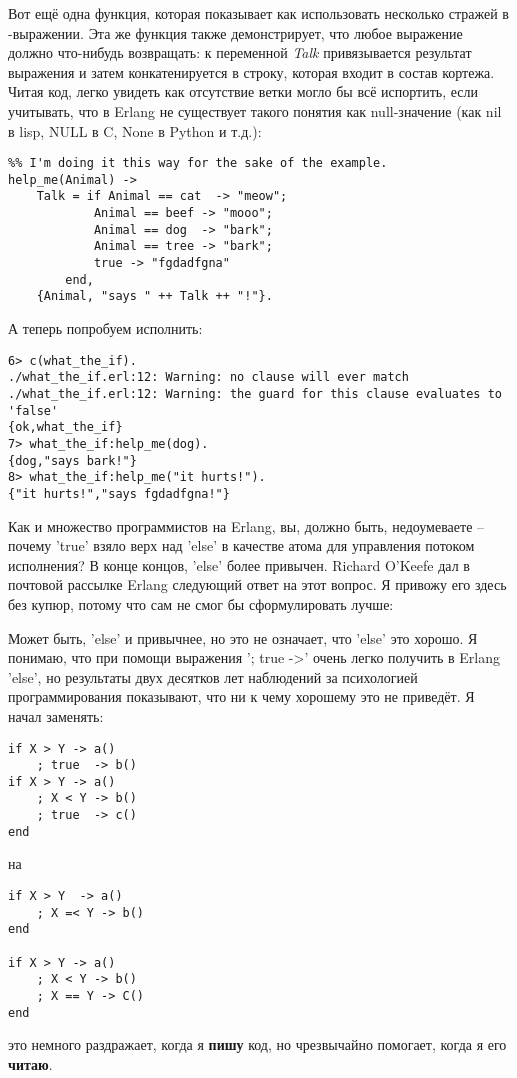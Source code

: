 Вот ещё одна функция, которая показывает как использовать несколько стражей в \--выражении.
Эта же функция также демонстрирует, что любое выражение должно что\--нибудь возвращать: к переменной \emph{Talk} привязывается результат выражения  и затем конкатенируется в строку, которая входит в состав кортежа.
Читая код, легко увидеть как отсутствие ветки  могло бы всё испортить, если учитывать, что в Erlang не существует такого понятия как null\--значение (как nil в lisp, NULL в C, None в Python и т.д.):
\begin{lstlisting}[style=erlang]
%% note, this one would be better as a pattern match in function heads!
%% I'm doing it this way for the sake of the example.
help_me(Animal) ->
    Talk = if Animal == cat  -> "meow";
            Animal == beef -> "mooo";
            Animal == dog  -> "bark";
            Animal == tree -> "bark";
            true -> "fgdadfgna"
        end,
    {Animal, "says " ++ Talk ++ "!"}.
\end{lstlisting}
А теперь попробуем исполнить:
\begin{lstlisting}[style=erlang]
6> c(what_the_if).
./what_the_if.erl:12: Warning: no clause will ever match
./what_the_if.erl:12: Warning: the guard for this clause evaluates to 'false'
{ok,what_the_if}
7> what_the_if:help_me(dog).
{dog,"says bark!"}
8> what_the_if:help_me("it hurts!").
{"it hurts!","says fgdadfgna!"}
\end{lstlisting}
Как и множество программистов на Erlang, вы, должно быть, недоумеваете \--- почему 'true' взяло верх над 'else' в качестве атома для управления потоком исполнения?
В конце концов, 'else' более привычен.
Richard O'Keefe дал в почтовой рассылке Erlang следующий ответ на этот вопрос.
Я привожу его здесь без купюр, потому что сам не смог бы сформулировать лучше:\\
\colorbox{lgray}
{
    \begin{minipage}{\linewidth}
    Может быть, 'else' и привычнее, но это не означает, что 'else' это хорошо.
    Я понимаю, что при помощи выражения '; true ->' очень легко получить в Erlang 'else', но результаты двух десятков лет наблюдений за психологией программирования показывают, что ни к чему хорошему это не приведёт.
    Я начал заменять:
\end{minipage}
}
\begin{lstlisting}[style=erlang]
if X > Y -> a()
    ; true  -> b()
if X > Y -> a()
    ; X < Y -> b()
    ; true  -> c()
end
\end{lstlisting}
\colorbox{lgray}
{
    \begin{minipage}{\linewidth}
на
    \end{minipage}
}
\begin{lstlisting}[style=erlang]     
if X > Y  -> a()
    ; X =< Y -> b()
end

if X > Y -> a()
    ; X < Y -> b()
    ; X == Y -> C()
end
\end{lstlisting}
\colorbox{lgray}
{
    \begin{minipage}{\linewidth}
это немного раздражает, когда я \textbf{пишу} код, но чрезвычайно помогает, когда я его \textbf{читаю}.
    \end{minipage}
}

